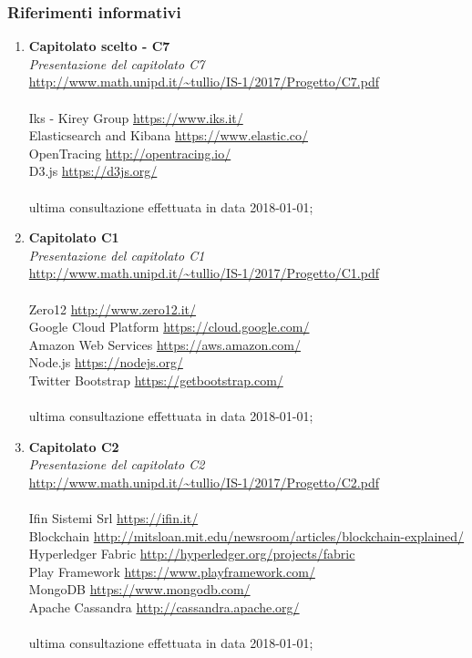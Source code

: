 \subsubsection{Riferimenti informativi}
\begin{enumerate}

\item 
	\textbf{Capitolato scelto - C7}\\
	\textit{Presentazione del capitolato C7}\\
	\url{http://www.math.unipd.it/~tullio/IS-1/2017/Progetto/C7.pdf}\\
	\\
	Iks - Kirey Group \url{https://www.iks.it/}\\
	Elasticsearch and Kibana \url{https://www.elastic.co/}\\
	OpenTracing \url{http://opentracing.io/}\\
	D3.js \url{https://d3js.org/}\\
	\\
	ultima consultazione effettuata in data 2018-01-01;\\

\item 
	\textbf{Capitolato C1}\\
	\textit{Presentazione del capitolato C1}\\
	\url{http://www.math.unipd.it/~tullio/IS-1/2017/Progetto/C1.pdf}\\
	\\
	Zero12 \url{http://www.zero12.it/}\\
	Google Cloud Platform \url{https://cloud.google.com/}\\
	Amazon Web Services \url{https://aws.amazon.com/}\\
	Node.js \url{https://nodejs.org/}\\
	Twitter Bootstrap \url{https://getbootstrap.com/}\\
	\\
	ultima consultazione effettuata in data 2018-01-01;\\

\item
	\textbf{Capitolato C2}\\
	\textit{Presentazione del capitolato C2}\\
	\url{http://www.math.unipd.it/~tullio/IS-1/2017/Progetto/C2.pdf}\\
	\\
	Ifin Sistemi Srl \url{https://ifin.it/}\\
	Blockchain \url{http://mitsloan.mit.edu/newsroom/articles/blockchain-explained/}\\
	Hyperledger Fabric \url{http://hyperledger.org/projects/fabric}\\
	Play Framework \url{https://www.playframework.com/}\\
	MongoDB \url{https://www.mongodb.com/}\\
	Apache Cassandra \url{http://cassandra.apache.org/}\\
	\\
	ultima consultazione effettuata in data 2018-01-01;\\
	

\end{enumerate}

